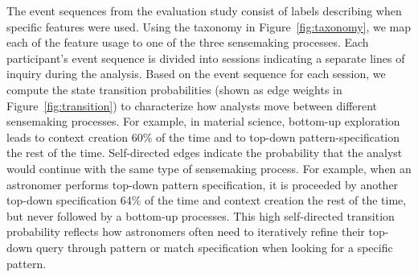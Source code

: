 \par The event sequences from the evaluation study consist of labels describing when specific features were used. Using the taxonomy in Figure~\ref{fig:taxonomy}, we map each of the feature usage to one of the three sensemaking processes. Each participant's event sequence is divided into sessions indicating a separate lines of inquiry during the analysis. Based on the event sequence for each session, we compute the state transition probabilities (shown as edge weights in Figure~\ref{fig:transition}) to characterize how analysts move between different sensemaking processes. For example, in material science, bottom-up exploration leads to context creation 60\% of the time and to top-down pattern-specification the rest of the time. Self-directed edges indicate the probability that the analyst would continue with the same type of sensemaking process. For example, when an astronomer performs top-down pattern specification, it is proceeded by another top-down specification 64\% of the time and context creation the rest of the time, but never followed by a bottom-up processes. This high self-directed transition probability reflects how astronomers often need to iteratively refine their top-down query through pattern or match specification when looking for a specific pattern. %
